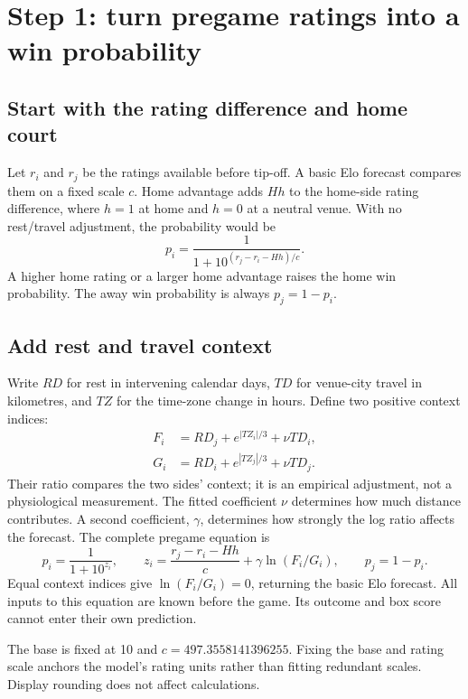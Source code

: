 \documentclass[11pt]{article}
\begin{document}
\section{Step 1: turn pregame ratings into a win probability}
\subsection{Start with the rating difference and home court}
Let $r_i$ and $r_j$ be the ratings available before tip-off. A basic Elo
forecast compares them on a fixed scale $c$. Home advantage adds $Hh$ to
the home-side rating difference, where $h=1$ at home and $h=0$ at a neutral
venue. With no rest/travel adjustment, the probability would be
\begin{equation}
 p_i=\frac{1}{1+10^{(r_j-r_i-Hh)/c}}.
\end{equation}
A higher home rating or a larger home advantage raises the home win probability.
The away win probability is always $p_j=1-p_i$.

\subsection{Add rest and travel context}
Write $RD$ for rest in intervening calendar days, $TD$ for venue-city travel
in kilometres, and $TZ$ for the time-zone change in hours. Define two positive
context indices:
\begin{align}
 F_i&=RD_j+e^{|TZ_i|/3}+\nu TD_i,\\
 G_i&=RD_i+e^{|TZ_j|/3}+\nu TD_j.
\end{align}
Their ratio compares the two sides' context; it is an empirical adjustment,
not a physiological measurement. The fitted coefficient $\nu$ determines how
much distance contributes. A second coefficient, $\gamma$, determines how
strongly the log ratio affects the forecast. The complete pregame equation is
\begin{equation}\label{eq:probability}
 \boxed{p_i=\frac{1}{1+10^{z_i}}},\qquad
 z_i=\frac{r_j-r_i-Hh}{c}+\gamma\ln(F_i/G_i),\qquad p_j=1-p_i.
\end{equation}
Equal context indices give $\ln(F_i/G_i)=0$, returning the basic Elo forecast.
All inputs to this equation are known before the game. Its outcome and
box score cannot enter their own prediction.

The base is fixed at 10 and $c=497.3558141396255$. Fixing the base and rating scale anchors the model's rating units rather
than fitting redundant scales. Display rounding does not affect calculations.
\end{document}
